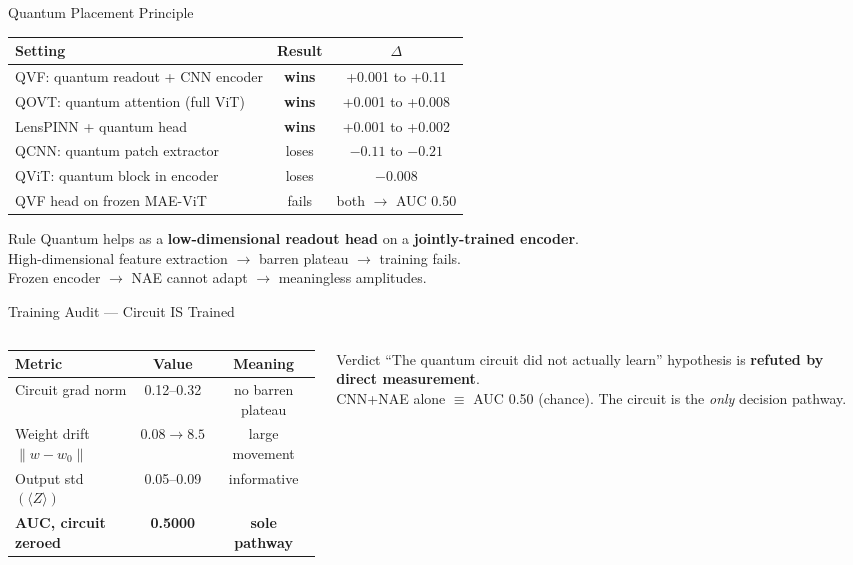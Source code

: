 \documentclass[aspectratio=169]{beamer}
\newcommand{\win}[1]{\textcolor{good}{\textbf{#1}}}
\newcommand{\lose}[1]{\textcolor{bad}{#1}}
\begin{document}
\begin{frame}{Quantum Placement Principle}

\begin{tabular}{@{}p{5.5cm}cc@{}}
\toprule
Setting & Result & $\Delta$ \\
\midrule
QVF: quantum readout + CNN encoder & \win{wins} & +0.001 to +0.11 \\
QOVT: quantum attention (full ViT) & \win{wins} & +0.001 to +0.008 \\
LensPINN + quantum head & \win{wins} & +0.001 to +0.002 \\
\midrule
QCNN: quantum patch extractor & \lose{loses} & $-0.11$ to $-0.21$ \\
QViT: quantum block in encoder & \lose{loses} & $-0.008$ \\
QVF head on frozen MAE-ViT & \lose{fails} & both $\to$ AUC 0.50 \\
\bottomrule
\end{tabular}

\bigskip
\begin{alertblock}{Rule}
Quantum helps as a \textbf{low-dimensional readout head} on a \textbf{jointly-trained encoder}.\\
High-dimensional feature extraction $\to$ barren plateau $\to$ training fails.\\
Frozen encoder $\to$ NAE cannot adapt $\to$ meaningless amplitudes.
\end{alertblock}
\end{frame}

\begin{frame}{Training Audit --- Circuit IS Trained}

\begin{columns}
\begin{column}{0.5\textwidth}
\begin{tabular}{@{}lcc@{}}
\toprule
Metric & Value & Meaning \\
\midrule
Circuit grad norm & 0.12--0.32 & no barren plateau \\
Weight drift $\|w-w_0\|$ & $0.08\to8.5$ & large movement \\
Output std $(\langle Z\rangle)$ & 0.05--0.09 & informative \\
\midrule
\textbf{AUC, circuit zeroed} & \textbf{0.5000} & \textbf{sole pathway} \\
\bottomrule
\end{tabular}
\end{column}
\begin{column}{0.47\textwidth}
\begin{alertblock}{Verdict}
``The quantum circuit did not actually learn'' hypothesis is \textbf{refuted by direct measurement}.\\[6pt]
CNN+NAE alone $\equiv$ AUC 0.50 (chance). The circuit is the \emph{only} decision pathway.
\end{alertblock}
\end{column}
\end{columns}
\end{frame}
\end{document}
